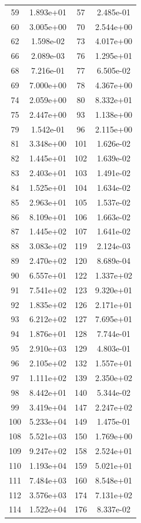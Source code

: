 \documentclass[12pt]{article}
\begin{document}
\begin{longtable}{@{}cccc@{}}
59 & 1.893e+01 & 57 & 2.485e-01 \\
60 & 3.005e+00 & 70 & 2.544e+00 \\
62 & 1.598e-02 & 73 & 4.017e+00 \\
66 & 2.089e-03 & 76 & 1.295e+01 \\
68 & 7.216e-01 & 77 & 6.505e-02 \\
69 & 7.000e+00 & 78 & 4.367e+00 \\
74 & 2.059e+00 & 80 & 8.332e+01 \\
75 & 2.447e+00 & 93 & 1.138e+00 \\
79 & 1.542e-01 & 96 & 2.115e+00 \\
81 & 3.348e+00 & 101 & 1.626e-02 \\
82 & 1.445e+01 & 102 & 1.639e-02 \\
83 & 2.403e+01 & 103 & 1.491e-02 \\
84 & 1.525e+01 & 104 & 1.634e-02 \\
85 & 2.963e+01 & 105 & 1.537e-02 \\
86 & 8.109e+01 & 106 & 1.663e-02 \\
87 & 1.445e+02 & 107 & 1.641e-02 \\
88 & 3.083e+02 & 119 & 2.124e-03 \\
89 & 2.470e+02 & 120 & 8.689e-04 \\
90 & 6.557e+01 & 122 & 1.337e+02 \\
91 & 7.541e+02 & 123 & 9.320e+01 \\
92 & 1.835e+02 & 126 & 2.171e+01 \\
93 & 6.212e+02 & 127 & 7.695e+01 \\
94 & 1.876e+01 & 128 & 7.744e-01 \\
95 & 2.910e+03 & 129 & 4.803e-01 \\
96 & 2.105e+02 & 132 & 1.557e+01 \\
97 & 1.111e+02 & 139 & 2.350e+02 \\
98 & 8.442e+01 & 140 & 5.344e-02 \\
99 & 3.419e+04 & 147 & 2.247e+02 \\
100 & 5.233e+04 & 149 & 1.475e-01 \\
108 & 5.521e+03 & 150 & 1.769e+00 \\
109 & 9.247e+02 & 158 & 2.524e+01 \\
110 & 1.193e+04 & 159 & 5.021e+01 \\
111 & 7.484e+03 & 160 & 8.548e+01 \\
112 & 3.576e+03 & 174 & 7.131e+02 \\
114 & 1.522e+04 & 176 & 8.337e-02 \\

\end{longtable}
\end{document}
